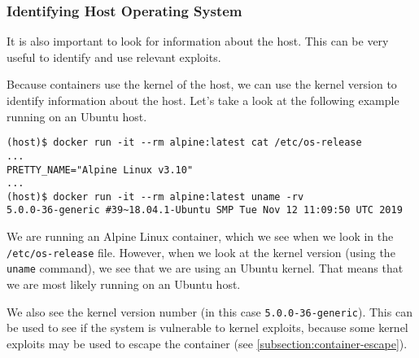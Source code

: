 \subsubsection{Identifying Host Operating System}
It is also important to look for information about the host. This can be very useful to identify and use relevant exploits.

\hfill

Because containers use the kernel of the host, we can use the kernel version to identify information about the host. Let's take a look at the following example running on an Ubuntu host.
\begin{lstlisting}[caption={\lstinline{/etc/os-release} and \lstinline{uname} differ},captionpos=b]
(host)$ docker run -it --rm alpine:latest cat /etc/os-release
...
PRETTY_NAME="Alpine Linux v3.10"
...
(host)$ docker run -it --rm alpine:latest uname -rv
5.0.0-36-generic #39~18.04.1-Ubuntu SMP Tue Nov 12 11:09:50 UTC 2019
\end{lstlisting}

We are running an Alpine Linux container, which we see when we look in the \lstinline{/etc/os-release} file. However, when we look at the kernel version (using the \lstinline{uname} command), we see that we are using an Ubuntu kernel. That means that we are most likely running on an Ubuntu host.

\hfill

We also see the kernel version number (in this case \lstinline{5.0.0-36-generic}). This can be used to see if the system is vulnerable to kernel exploits, because some kernel exploits may be used to escape the container (see \autoref{subsection:container-escape}).
